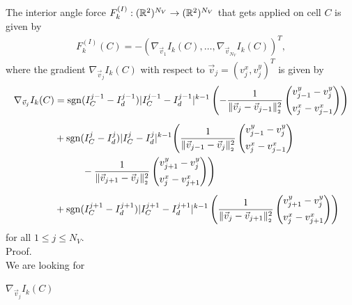 \begin{proposition}
	The interior angle force $F_{k}^{(I)}: (\mathbb{R}^2)^{N_V} \rightarrow (\mathbb{R}^2)^{N_V}$ that gets applied on cell $C$ is given by  
	\begin{align*}
		F_{k}^{(I)}(C) 
		= - (\nabla_{\vec{v}_1} I_k(C), \ldots, \nabla_{\vec{v}_{N_V}} I_k(C))^T,
	\end{align*}
	where the gradient $\nabla_{\vec{v}_j} I_k(C)$ with respect to $\vec{v}_j = (v_{j}^{x}, v_{j}^{y})^T$ is given by 
	\begin{align}
		\begin{split}
			\nabla_{\vec{v}_j} I_k(C) &= \sgn(I^{j-1}_{C} - I^{j-1}_d) |I^{j-1}_{C} - I^{j-1}_d|^{k-1} \left( 
					- \frac{1}{\norm[\vec{v}_{j} - \vec{v}_{j-1}]^{2}} \begin{pmatrix}
						v_{j-1}^{y} - v_{j}^{y} \\[0.5em]
						v_{j}^{x} - v_{j-1}^{x}
					\end{pmatrix} 
				\right) \\[0.5em] 
			&+ \sgn(I^{j}_{C} - I^{j}_d)|I^{j}_{C} - I^{j}_d|^{k-1} \Biggl( 
				\frac{1}{\norm[\vec{v}_{j-1} - \vec{v}_j]^{2}} \begin{pmatrix}
				v_{j-1}^{y} - v_{j}^{y} \\[0.5em]
				v_{j}^{x} - v_{j-1}^{x}
				\end{pmatrix} \\
			&\hspace{1cm} - \frac{1}{\norm[\vec{v}_{j+1} - \vec{v}_j]^2} \begin{pmatrix}
				v_{j+1}^{y} - v_{j}^{y} \\[0.5em]
				v_{j}^{x} - v_{j+1}^{x}
				\end{pmatrix} 
				\Biggr) \\[0.5em] 
			&+ \sgn(I^{j+1}_{C} - I^{j+1}_d) |I^{j+1}_{C} - I^{j+1}_d|^{k-1} \left( 
				\frac{1}{\norm[\vec{v}_{j} - \vec{v}_{j+1}]^2} \begin{pmatrix}
				v_{j+1}^{y} - v_{j}^{y} \\[0.5em]
				v_{j}^{x} - v_{j+1}^{x}
				\end{pmatrix} 
				\right) %
		\end{split}
		\label{gradient:angle}
	\end{align}
	for all $1 \leq j \leq N_V$.\\

	Proof. \\
	We are looking for 
	\begin{center}
		$
		\nabla_{\vec{v}_j} I_k(C)
		$
	\end{center}
	

\end{proposition}
